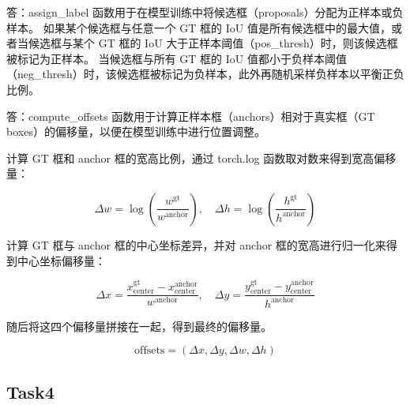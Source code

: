 \documentclass{article}%
\begin{document}
答：assign\_label 函数用于在模型训练中将候选框（proposals）分配为正样本或负样本。
如果某个候选框与任意一个 GT 框的 IoU 值是所有候选框中的最大值，或者当候选框与某个 GT 框的 IoU 大于正样本阈值（pos\_thresh）时，则该候选框被标记为正样本。
当候选框与所有 GT 框的 IoU 值都小于负样本阈值（neg\_thresh）时，该候选框被标记为负样本，此外再随机采样负样本以平衡正负比例。


答：compute\_offsets 函数用于计算正样本框（anchors）相对于真实框（GT boxes）的偏移量，以便在模型训练中进行位置调整。

计算 GT 框和 anchor 框的宽高比例，通过 torch.log 函数取对数来得到宽高偏移量：

\begin{equation}
    \Delta w = \log\left(\frac{w^{\text{gt}}}{w^{\text{anchor}}}\right), \quad \Delta h = \log\left(\frac{h^{\text{gt}}}{h^{\text{anchor}}}\right)
\end{equation}

计算 GT 框与 anchor 框的中心坐标差异，并对 anchor 框的宽高进行归一化来得到中心坐标偏移量：

\begin{equation}
    \Delta x = \frac{x_{\text{center}}^{\text{gt}} - x_{\text{center}}^{\text{anchor}}}{w^{\text{anchor}}}, \quad \Delta y = \frac{y_{\text{center}}^{\text{gt}} - y_{\text{center}}^{\text{anchor}}}{h^{\text{anchor}}}
\end{equation}

随后将这四个偏移量拼接在一起，得到最终的偏移量。

\begin{equation}
    \text{offsets} = (\Delta x, \Delta y, \Delta w, \Delta h)
\end{equation}

\subsection{Task4}
\end{document}
